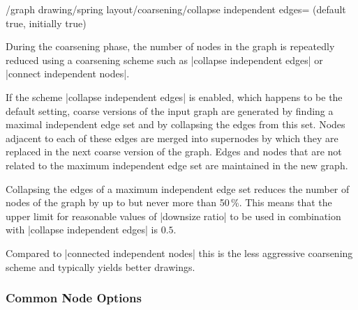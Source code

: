 \begin{key}{/graph drawing/spring layout/coarsening/collapse independent
  edges= (default true, initially true)}

  During the coarsening phase, the number of nodes in the graph is
  repeatedly reduced using a coarsening scheme such as 
  |collapse independent edges| or |connect independent nodes|.

  If the scheme |collapse independent edges| is enabled, which happens
  to be the default setting, coarse versions of the input graph are 
  generated by finding a maximal independent edge set and by collapsing
  the edges from this set. Nodes adjacent to each of these edges are
  merged into supernodes by which they are replaced in the next coarse
  version of the graph. Edges and nodes that are not related to the
  maximum independent edge set are maintained in the new graph.

  Collapsing the edges of a maximum independent edge set reduces the
  number of nodes of the graph by up to but never more than 50\,\%. 
  This means that the upper limit for reasonable values of 
  |downsize ratio| to be used in combination with 
  |collapse independent edges| is $0.5$. 
  
  Compared to |connected independent nodes| this is the less aggressive
  coarsening scheme and typically yields better drawings.
\end{key}


\subsubsection{Common Node Options}

%

